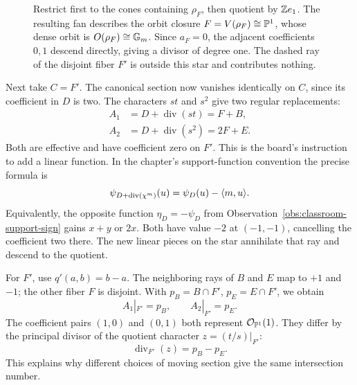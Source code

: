 \begin{example}
\begin{figure}[htbp]
\caption{Restrict first to the cones containing \(\rho_F\), then quotient
by \(\mathbb{Z} e_1\). The resulting fan describes the orbit closure
\(F=V(\rho_F)\cong\mathbb{P}^1\), whose dense orbit is \(O(\rho_F)\cong\mathbb{G}_{m}\).
Since \(a_F=0\), the adjacent coefficients \(0,1\) descend directly,
giving a divisor of degree one. The dashed ray of the disjoint fiber
\(F'\) is outside this star and contributes nothing.}
\label{fig:classroom-oct19-star-restriction}
\end{figure}

Next take \(C=F'\). The canonical section now vanishes identically
on \(C\), since its coefficient in \(D\) is two. The characters
\(st\) and \(s^2\) give two regular replacements:
\[
\begin{aligned}
A_1&=D+\operatorname{div}(st)=F+B,\\
A_2&=D+\operatorname{div}(s^2)=2F+E.
\end{aligned}
\]
Both are effective and have coefficient zero on \(F'\). This is the
board's instruction to add a linear function. In the chapter's
support-function convention the precise formula is
\[
\psi_{D+\operatorname{div}(\chi^{m})}(u)
=\psi_D(u)-\langle m,u\rangle.
\]
Equivalently, the opposite function \(\eta_D=-\psi_D\) from
Observation~\ref{obs:classroom-support-sign} gains \(x+y\) or \(2x\).
Both have value \(-2\) at \((-1,-1)\), cancelling the coefficient
two there. The new linear pieces on the star annihilate that ray
and descend to the quotient.

For \(F'\), use \(q'(a,b)=b-a\). The neighboring rays of \(B\)
and \(E\) map to \(+1\) and \(-1\); the other fiber \(F\) is
disjoint. With \(p_B=B\cap F'\), \(p_E=E\cap F'\), we obtain
\[
A_1|_{F'}=p_B,\qquad A_2|_{F'}=p_E.
\]
The coefficient pairs \((1,0)\) and \((0,1)\) both represent
\(\mathcal O_{\mathbb{P}^1}(1)\). They differ by the principal divisor
of the quotient character \(z=(t/s)|_{F'}\):
\[
\operatorname{div}_{F'}(z)=p_B-p_E.
\]
This explains why different choices of moving section give the same
intersection number.


\end{example}
